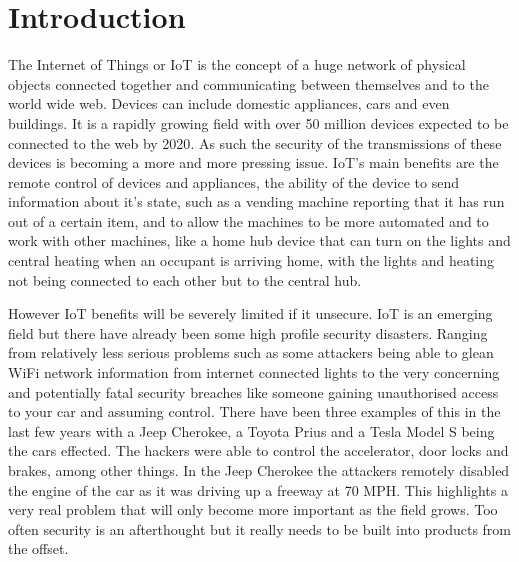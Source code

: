 
\chapter{Introduction}
\label{intro}


\newcommand{\keyword}[1]{\textbf{#1}}
\newcommand{\tabhead}[1]{\textbf{#1}}
\newcommand{\code}[1]{\texttt{#1}}
\newcommand{\file}[1]{\texttt{\bfseries#1}}
\newcommand{\option}[1]{\texttt{\itshape#1}}


The Internet of Things or IoT is the concept of a huge network of physical objects connected together and communicating between themselves and to the world wide web. Devices can include domestic appliances, cars and even buildings. It is a rapidly growing field with over 50 million devices expected to be connected to the web by 2020\cite{50milby2020}. As such the security of the transmissions of these devices is becoming a more and more pressing issue. IoT's main benefits are the remote control of devices and appliances, the ability of the device to send information about it's state, such as a vending machine reporting that it has run out of a certain item, and to allow the machines to be more automated and to work with other machines, like a home hub device that can turn on the lights and central heating when an occupant is arriving home, with the lights and heating not being connected to each other but to the central hub.
	
	However IoT benefits will be severely limited if it unsecure. IoT is an emerging field but there have already been some high profile security disasters. Ranging from relatively less serious problems such as some attackers being able to glean WiFi network information from internet connected lights\cite{hackingsum} to the very concerning and potentially fatal security breaches like someone gaining unauthorised access to your car and assuming control. There have been three examples of this in the last few years with a Jeep Cherokee\cite{jeephack}, a Toyota Prius\cite{priushack} and a Tesla Model S\cite{teslahack} being the cars effected. The hackers were able to control the accelerator, door locks and brakes, among other things. In the Jeep Cherokee the attackers remotely disabled the engine of the car as it was driving up a freeway at 70 MPH. This highlights a very real problem that will only become more important as the field grows. Too often security is an afterthought but it really needs to be built into products from the offset.

